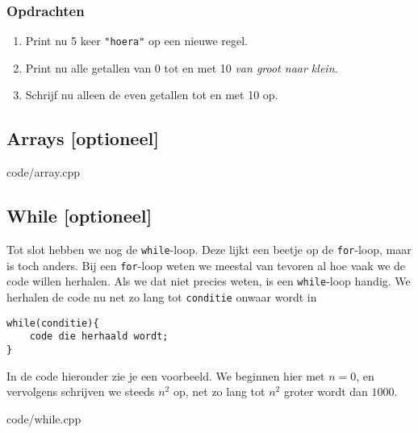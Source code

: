 \documentclass[12pt,a4paper]{article}
\newcommand{\code}{}
\newcommand{\icode}{\lstinline}
\begin{document}
\subsubsection{Opdrachten}
\begin{enumerate}
	\item
		Print nu 5 keer \icode{"hoera"} op een nieuwe regel.
    \item 
        Print nu alle getallen van 0 tot en met 10 \textit{van groot naar klein}.
	\item
		Schrijf nu alleen de even getallen tot en met 10 op.
\end{enumerate}

\clearpage
\subsection{Arrays [optioneel]}

\code{code/array.cpp}

\subsection{While [optioneel]}
Tot slot hebben we nog de \icode{while}-loop. Deze lijkt een beetje op de \icode{for}-loop, maar is toch anders. Bij een \icode{for}-loop weten we meestal van tevoren al hoe vaak we de code willen herhalen. Als we dat niet precies weten, is een \icode{while}-loop handig. We herhalen de code nu net zo lang tot \icode{conditie} onwaar wordt in
\begin{lstlisting}
while(conditie){
	code die herhaald wordt;
}
\end{lstlisting}
In de code hieronder zie je een voorbeeld. We beginnen hier met $n=0$, en vervolgens schrijven we steeds $n^2$ op, net zo lang tot $n^2$ groter wordt dan $1000$.

\code{code/while.cpp}

\clearpage
\end{document}

